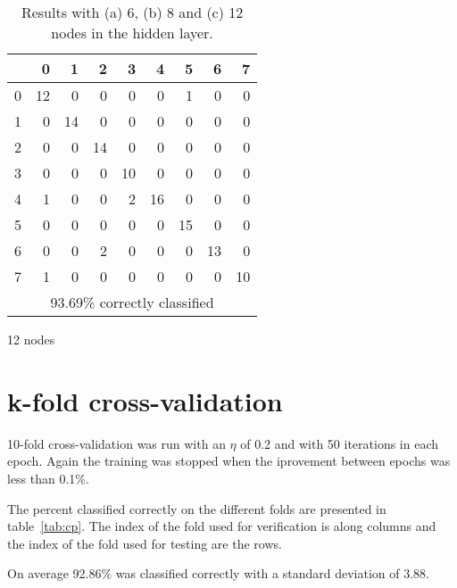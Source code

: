 \documentclass[a4paper]{article}
\begin{document}
\begin{table}[h]
  \begin{subtable}{0.6\textwidth}
    \centering
    \begin{tabular}{r|rrrrrrrr}
      & 0 & 1 & 2 & 3 & 4 & 5 & 6 & 7 \\
      \hline
      0 & 12 &  0 &  0 &  0 &  0 &  1 &  0 &  0 \\
      1 &  0 & 14 &  0 &  0 &  0 &  0 &  0 &  0 \\
      2 &  0 &  0 & 14 &  0 &  0 &  0 &  0 &  0 \\
      3 &  0 &  0 &  0 & 10 &  0 &  0 &  0 &  0 \\
      4 &  1 &  0 &  0 &  2 & 16 &  0 &  0 &  0 \\
      5 &  0 &  0 &  0 &  0 &  0 & 15 &  0 &  0 \\
      6 &  0 &  0 &  2 &  0 &  0 &  0 & 13 &  0 \\
      7 &  1 &  0 &  0 &  0 &  0 &  0 &  0 & 10 \\
      \hline
      \multicolumn{9}{c}{93.69\% correctly classified}
    \end{tabular}
    \caption{12 nodes}
  \end{subtable}

  \caption{Results with (a) 6, (b) 8 and (c) 12 nodes in
    the hidden layer.}
    \label{tab:cm}
\end{table}

\section*{k-fold cross-validation}

10-fold cross-validation was run with an $\eta$ of 0.2 and
with 50 iterations in each epoch. Again the training was stopped
when the iprovement between epochs was less than 0.1\%.

The percent classified correctly on the different folds are
presented in table~\ref{tab:cp}. The index of the fold used
for verification is along columns and the index of the fold
used for testing are the rows.

On average 92.86\% was classified correctly with a
standard deviation of 3.88.
\end{document}
